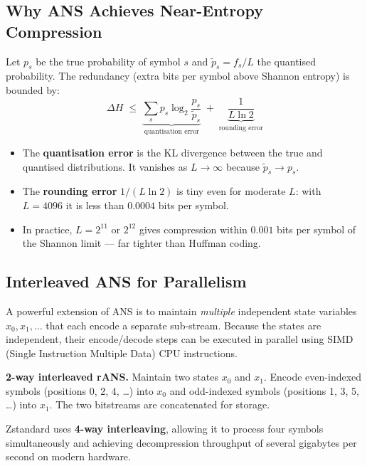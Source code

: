 \subsection{Why ANS Achieves Near-Entropy Compression}

\begin{theorem}
Let $p_s$ be the true probability of symbol $s$ and
$\tilde{p}_s = f_s / L$ the quantised probability.  The
redundancy (extra bits per symbol above Shannon entropy) is
bounded by:
\[
  \Delta H \;\leq\;
  \underbrace{\sum_s p_s \log_2 \frac{p_s}{\tilde{p}_s}}_{\text{quantisation error}}
  \;+\;
  \underbrace{\frac{1}{L \ln 2}}_{\text{rounding error}}
\]
\end{theorem}

\begin{itemize}[leftmargin=2em]
  \item The \textbf{quantisation error} is the KL divergence
        between the true and quantised distributions.  It
        vanishes as $L \to \infty$ because $\tilde{p}_s \to p_s$.

  \item The \textbf{rounding error} $1/(L\ln 2)$ is tiny
        even for moderate $L$: with $L = 4096$ it is less
        than $0.0004$ bits per symbol.

  \item In practice, $L = 2^{11}$ or $2^{12}$ gives
        compression within $0.001$ bits per symbol of the
        Shannon limit — far tighter than Huffman coding.
\end{itemize}

\subsection{Interleaved ANS for Parallelism}

A powerful extension of ANS is to maintain \emph{multiple}
independent state variables $x_0, x_1, \ldots$ that each
encode a separate sub-stream.  Because the states are
independent, their encode/decode steps can be executed in
parallel using SIMD (Single Instruction Multiple Data) CPU
instructions.

\begin{examplebox}
\textbf{2-way interleaved rANS.}
Maintain two states $x_0$ and $x_1$.  Encode even-indexed
symbols (positions 0, 2, 4, \ldots) into $x_0$ and
odd-indexed symbols (positions 1, 3, 5, \ldots) into $x_1$.
The two bitstreams are concatenated for storage.

Zstandard uses \textbf{4-way interleaving}, allowing it to
process four symbols simultaneously and achieving decompression
throughput of several gigabytes per second on modern hardware.
\end{examplebox}

